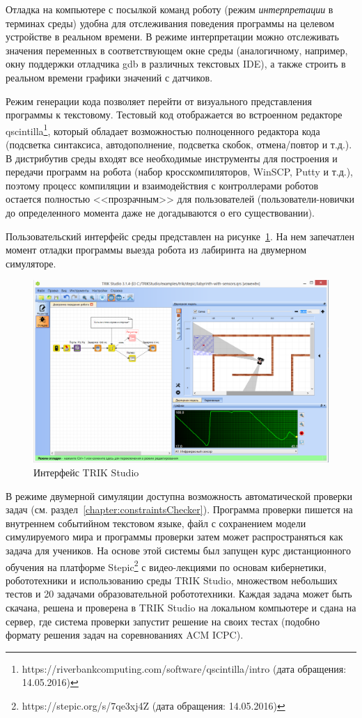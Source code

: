 \documentclass[a5paper]{article}
\begin{document}
Отладка на компьютере с посылкой команд роботу (режим \textit{интерпретации} в терминах среды) удобна для отслеживания поведения программы на целевом устройстве в реальном времени. В режиме интерпретации можно отслеживать значения переменных в соответствующем окне среды (аналогичному, например, окну поддержки отладчика gdb в различных текстовых IDE), а также строить в реальном времени графики значений с датчиков.

Режим генерации кода позволяет перейти от визуального представления программы к текстовому. Тестовый код отображается во встроенном редакторе qscintilla\footnote{https://riverbankcomputing.com/software/qscintilla/intro (дата обращения: 14.05.2016)}, который обладает возможностью полноценного редактора кода (подсветка синтаксиса, автодополнение, подсветка скобок, отмена/повтор и т.д.). В дистрибутив среды входят все необходимые инструменты для построения и передачи программ на робота (набор кросскомпиляторов, WinSCP, Putty и т.д.), поэтому процесс компиляции и взаимодействия с контроллерами роботов остается полностью <<прозрачным>> для пользователей (пользователи-новички до определенного момента даже не догадываются о его существовании).

Пользовательский интерфейс среды представлен на рисунке~\ref{image:TS_interface}. На нем запечатлен момент отладки программы выезда робота из лабиринта на двумерном симуляторе.

\begin{figure}[ht]
    \centering
    \includegraphics[width=4.5in]{TS_CF_Labyrinth.png}
    \caption{Интерфейс TRIK Studio}
    \label{image:TS_interface}
\end{figure}

В режиме двумерной симуляции доступна возможность автоматической проверки задач (см. раздел~\ref{chapter:constraintsChecker}). Программа проверки пишется на внутреннем событийном текстовом языке, файл с сохранением модели симулируемого мира и программы проверки затем может распространяться как задача для учеников. На основе этой системы был запущен курс дистанционного обучения на платформе Stepic\footnote{https://stepic.org/s/7qe3xj4Z  (дата обращения: 14.05.2016)} с видео-лекциями по основам кибернетики, робототехники и использованию среды TRIK Studio, множеством небольших тестов и 20 задачами образовательной робототехники. Каждая задача может быть скачана, решена и проверена в TRIK Studio на локальном компьютере и сдана на сервер, где система проверки запустит решение на своих тестах (подобно формату решения задач на соревнованиях ACM ICPC).
\end{document}
